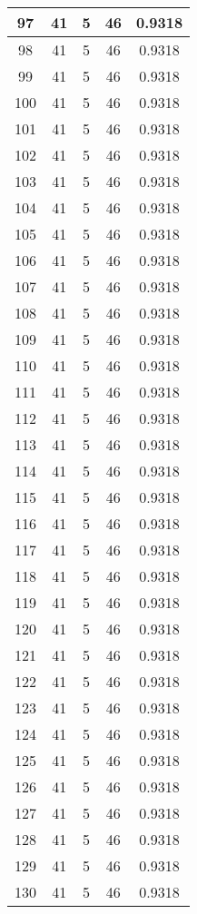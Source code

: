 \documentclass[letterpaper, 12pt]{article}
\begin{document}
\begin{longtable}{|c|c|c|c|c|}
\hline
97 & 41 & 5 & 46 & 0.9318 \\
\hline
98 & 41 & 5 & 46 & 0.9318 \\
\hline
99 & 41 & 5 & 46 & 0.9318 \\
\hline
100 & 41 & 5 & 46 & 0.9318 \\
\hline
101 & 41 & 5 & 46 & 0.9318 \\
\hline
102 & 41 & 5 & 46 & 0.9318 \\
\hline
103 & 41 & 5 & 46 & 0.9318 \\
\hline
104 & 41 & 5 & 46 & 0.9318 \\
\hline
105 & 41 & 5 & 46 & 0.9318 \\
\hline
106 & 41 & 5 & 46 & 0.9318 \\
\hline
107 & 41 & 5 & 46 & 0.9318 \\
\hline
108 & 41 & 5 & 46 & 0.9318 \\
\hline
109 & 41 & 5 & 46 & 0.9318 \\
\hline
110 & 41 & 5 & 46 & 0.9318 \\
\hline
111 & 41 & 5 & 46 & 0.9318 \\
\hline
112 & 41 & 5 & 46 & 0.9318 \\
\hline
113 & 41 & 5 & 46 & 0.9318 \\
\hline
114 & 41 & 5 & 46 & 0.9318 \\
\hline
115 & 41 & 5 & 46 & 0.9318 \\
\hline
116 & 41 & 5 & 46 & 0.9318 \\
\hline
117 & 41 & 5 & 46 & 0.9318 \\
\hline
118 & 41 & 5 & 46 & 0.9318 \\
\hline
119 & 41 & 5 & 46 & 0.9318 \\
\hline
120 & 41 & 5 & 46 & 0.9318 \\
\hline
121 & 41 & 5 & 46 & 0.9318 \\
\hline
122 & 41 & 5 & 46 & 0.9318 \\
\hline
123 & 41 & 5 & 46 & 0.9318 \\
\hline
124 & 41 & 5 & 46 & 0.9318 \\
\hline
125 & 41 & 5 & 46 & 0.9318 \\
\hline
126 & 41 & 5 & 46 & 0.9318 \\
\hline
127 & 41 & 5 & 46 & 0.9318 \\
\hline
128 & 41 & 5 & 46 & 0.9318 \\
\hline
129 & 41 & 5 & 46 & 0.9318 \\
\hline
130 & 41 & 5 & 46 & 0.9318 \\

\end{longtable}
\end{document}
